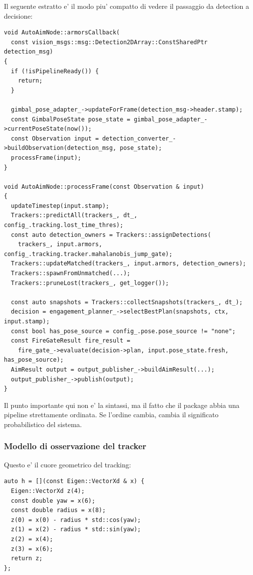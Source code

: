 \documentclass[11pt,a4paper]{article}
\begin{document}
Il seguente estratto e' il modo piu' compatto di vedere il passaggio da detection a decisione:

\begin{lstlisting}[style=cppstyle,caption={Estratto reale semplificato da AutoAimNode: callback e pipeline per-frame}]
void AutoAimNode::armorsCallback(
  const vision_msgs::msg::Detection2DArray::ConstSharedPtr detection_msg)
{
  if (!isPipelineReady()) {
    return;
  }

  gimbal_pose_adapter_->updateForFrame(detection_msg->header.stamp);
  const GimbalPoseState pose_state = gimbal_pose_adapter_->currentPoseState(now());
  const Observation input = detection_converter_->buildObservation(detection_msg, pose_state);
  processFrame(input);
}

void AutoAimNode::processFrame(const Observation & input)
{
  updateTimestep(input.stamp);
  Trackers::predictAll(trackers_, dt_, config_.tracking.lost_time_thres);
  const auto detection_owners = Trackers::assignDetections(
    trackers_, input.armors, config_.tracking.tracker.mahalanobis_jump_gate);
  Trackers::updateMatched(trackers_, input.armors, detection_owners);
  Trackers::spawnFromUnmatched(...);
  Trackers::pruneLost(trackers_, get_logger());

  const auto snapshots = Trackers::collectSnapshots(trackers_, dt_);
  decision = engagement_planner_->selectBestPlan(snapshots, ctx, input.stamp);
  const bool has_pose_source = config_.pose.pose_source != "none";
  const FireGateResult fire_result =
    fire_gate_->evaluate(decision->plan, input.pose_state.fresh, has_pose_source);
  AimResult output = output_publisher_->buildAimResult(...);
  output_publisher_->publish(output);
}
\end{lstlisting}

Il punto importante qui non e' la sintassi, ma il fatto che il package abbia una pipeline strettamente ordinata. Se l'ordine cambia, cambia il significato probabilistico del sistema.

\subsubsection{Modello di osservazione del tracker}

Questo e' il cuore geometrico del tracking:

\begin{lstlisting}[style=cppstyle,caption={Estratto reale dalla TrackerFactory: modello di osservazione h(x)}]
auto h = [](const Eigen::VectorXd & x) {
  Eigen::VectorXd z(4);
  const double yaw = x(6);
  const double radius = x(8);
  z(0) = x(0) - radius * std::cos(yaw);
  z(1) = x(2) - radius * std::sin(yaw);
  z(2) = x(4);
  z(3) = x(6);
  return z;
};
\end{lstlisting}
\end{document}
